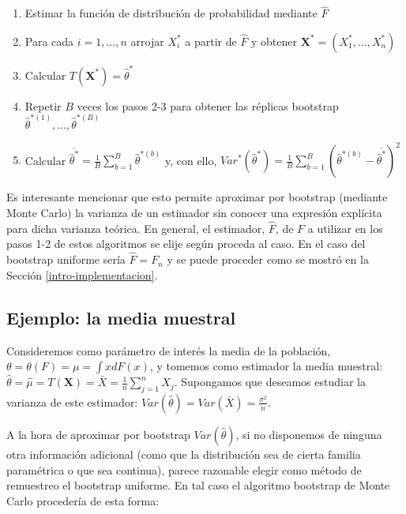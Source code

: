 \documentclass[
]{book}
\theoremstyle{break}
\theoremstyle{definition}
\theoremstyle{definition}
\theoremstyle{definition}
\theoremstyle{remark}
\begin{document}
\begin{enumerate}
\def\labelenumi{\arabic{enumi}.}
\item
  Estimar la función de distribución de probabilidad mediante \(\hat{ F}\)
\item
  Para cada \(i=1,\ldots ,n\) arrojar \(X_i^{\ast}\) a partir de
  \(\hat{F}\) y obtener
  \(\mathbf{X}^{\ast}=\left( X_1^{\ast}, \ldots, X_n^{\ast} \right)\)
\item
  Calcular
  \(T\left( \mathbf{X}^{\ast} \right) = \hat{\theta}^{\ast}\)
\item
  Repetir \(B\) veces los pasos 2-3 para obtener las réplicas bootstrap
  \(\hat{\theta}^{\ast (1)}, \ldots, \hat{\theta}^{\ast(B)}\)
\item
  Calcular
  \(\overline{\hat{\theta}^{\ast}}=\frac{1}{B}\sum_{b=1}^{B}\hat{ \theta}^{\ast (b)}\) y, con ello,
  \(Var^{\ast}\left( \hat{\theta}^{\ast} \right) =\frac{1}{B}\sum_{b=1}^{B}\left( \hat{\theta}^{\ast \left(b \right)}-\overline{\hat{\theta}^{\ast}} \right)^2\)
\end{enumerate}

Es interesante mencionar que esto permite aproximar por bootstrap
(mediante Monte Carlo) la varianza de un estimador sin conocer una
expresión explícita para dicha varianza teórica.
En general, el estimador, \(\hat{F}\), de \(F\) a utilizar en los pasos 1-2
de estos algoritmos se elije según proceda al caso. En el caso del
bootstrap uniforme sería \(\hat{F}=F_n\) y se puede proceder
como se mostró en la Sección \ref{intro-implementacion}.

\hypertarget{ejemplo-la-media-muestral}{%
\subsection{Ejemplo: la media muestral}\label{ejemplo-la-media-muestral}}

Consideremos como parámetro de interés la media de la población,
\(\theta =\theta \left( F \right) =\mu =\int xdF\left( x \right)\), y
tomemos como estimador la media muestral:
\(\hat{\theta}=\hat{\mu}=T\left( \mathbf{X} \right) =\bar{X}=\frac{1}{n}\sum_{j=1}^{n}X_j\).
Supongamos que deseamos estudiar la varianza de este estimador:
\(Var\left( \hat{\theta} \right) =Var\left( \bar{X} \right) =\frac{\sigma^2}{n}\).

A la hora de aproximar por bootstrap \(Var\left( \hat{\theta} \right)\),
si no disponemos de ninguna otra información adicional (como que la
distribución sea de cierta familia paramétrica o que sea continua),
parece razonable elegir como método de remuestreo el bootstrap uniforme.
En tal caso el algoritmo bootstrap de Monte Carlo procedería de esta
forma:
\end{document}
